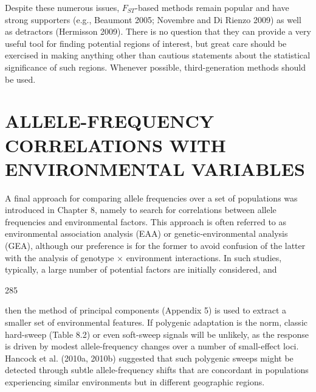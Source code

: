 \documentclass{article}
\begin{document}
Despite these numerous issues,  $ F_{ST} $-based methods remain popular and have strong supporters (e.g., Beaumont 2005; Novembre and Di Rienzo 2009) as well as detractors (Hermisson 2009). There is no question that they can provide a very useful tool for finding potential regions of interest, but great care should be exercised in making anything other than cautious statements about the statistical significance of such regions. Whenever possible, third-generation methods should be used.

\section{ALLELE-FREQUENCY CORRELATIONS WITH ENVIRONMENTAL VARIABLES}
A final approach for comparing allele frequencies over a set of populations was introduced in Chapter 8, namely to search for correlations between allele frequencies and environmental factors. This approach is often referred to as environmental association analysis (EAA) or genetic-environmental analysis (GEA), although our preference is for the former to avoid confusion of the latter with the analysis of genotype × environment interactions. In such studies, typically, a large number of potential factors are initially considered, and

285

then the method of principal components (Appendix 5) is used to extract a smaller set of environmental features. If polygenic adaptation is the norm, classic hard-sweep (Table 8.2) or even soft-sweep signals will be unlikely, as the response is driven by modest allele-frequency changes over a number of small-effect loci. Hancock et al. (2010a, 2010b) suggested that such polygenic sweeps might be detected through subtle allele-frequency shifts that are concordant in populations experiencing similar environments but in different geographic regions.
\end{document}
